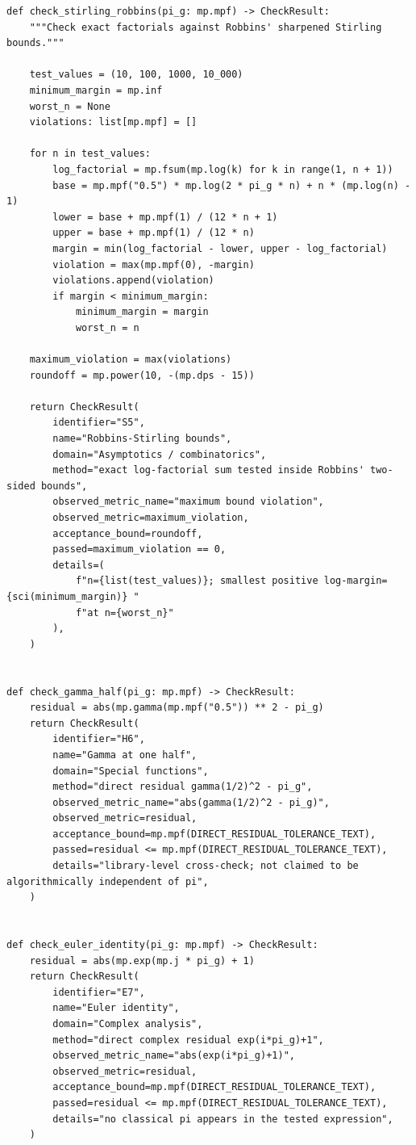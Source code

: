 \documentclass[11pt]{article}
\begin{document}
\begin{lstlisting}[style=pythonstyle,caption={\texttt{verify\_pi\_g\_identities.py}}]
def check_stirling_robbins(pi_g: mp.mpf) -> CheckResult:
    """Check exact factorials against Robbins' sharpened Stirling bounds."""

    test_values = (10, 100, 1000, 10_000)
    minimum_margin = mp.inf
    worst_n = None
    violations: list[mp.mpf] = []

    for n in test_values:
        log_factorial = mp.fsum(mp.log(k) for k in range(1, n + 1))
        base = mp.mpf("0.5") * mp.log(2 * pi_g * n) + n * (mp.log(n) - 1)
        lower = base + mp.mpf(1) / (12 * n + 1)
        upper = base + mp.mpf(1) / (12 * n)
        margin = min(log_factorial - lower, upper - log_factorial)
        violation = max(mp.mpf(0), -margin)
        violations.append(violation)
        if margin < minimum_margin:
            minimum_margin = margin
            worst_n = n

    maximum_violation = max(violations)
    roundoff = mp.power(10, -(mp.dps - 15))

    return CheckResult(
        identifier="S5",
        name="Robbins-Stirling bounds",
        domain="Asymptotics / combinatorics",
        method="exact log-factorial sum tested inside Robbins' two-sided bounds",
        observed_metric_name="maximum bound violation",
        observed_metric=maximum_violation,
        acceptance_bound=roundoff,
        passed=maximum_violation == 0,
        details=(
            f"n={list(test_values)}; smallest positive log-margin={sci(minimum_margin)} "
            f"at n={worst_n}"
        ),
    )


def check_gamma_half(pi_g: mp.mpf) -> CheckResult:
    residual = abs(mp.gamma(mp.mpf("0.5")) ** 2 - pi_g)
    return CheckResult(
        identifier="H6",
        name="Gamma at one half",
        domain="Special functions",
        method="direct residual gamma(1/2)^2 - pi_g",
        observed_metric_name="abs(gamma(1/2)^2 - pi_g)",
        observed_metric=residual,
        acceptance_bound=mp.mpf(DIRECT_RESIDUAL_TOLERANCE_TEXT),
        passed=residual <= mp.mpf(DIRECT_RESIDUAL_TOLERANCE_TEXT),
        details="library-level cross-check; not claimed to be algorithmically independent of pi",
    )


def check_euler_identity(pi_g: mp.mpf) -> CheckResult:
    residual = abs(mp.exp(mp.j * pi_g) + 1)
    return CheckResult(
        identifier="E7",
        name="Euler identity",
        domain="Complex analysis",
        method="direct complex residual exp(i*pi_g)+1",
        observed_metric_name="abs(exp(i*pi_g)+1)",
        observed_metric=residual,
        acceptance_bound=mp.mpf(DIRECT_RESIDUAL_TOLERANCE_TEXT),
        passed=residual <= mp.mpf(DIRECT_RESIDUAL_TOLERANCE_TEXT),
        details="no classical pi appears in the tested expression",
    )



\end{lstlisting}
\end{document}
